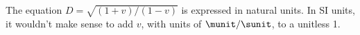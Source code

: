 The equation  $D=\sqrt{(1+v)/(1-v)}$ is expressed in natural units.
In SI units, it wouldn't make sense to add $v$, with units of $\munit/\sunit$,
to a unitless 1.
